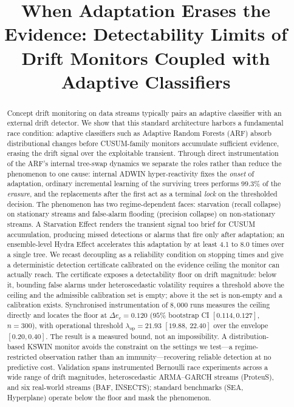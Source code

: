 \documentclass[10pt,conference]{IEEEtran}
\title{When Adaptation Erases the Evidence: Detectability Limits of Drift Monitors Coupled with Adaptive Classifiers}
\author{\IEEEauthorblockN{Anonymous Author(s)}
\IEEEauthorblockA{\textit{Anonymous Affiliation(s)}\\
Paper under Triple-Blind Review}}
\theoremstyle{definition}
\newcommand{\LambdaOpNarrow}{21.93}          %
\newcommand{\LambdaOpNarrowCI}{[19.88,\,22.40]}
\newcommand{\EnvLo}{0.20}\newcommand{\EnvHi}{0.40}
\newcommand{\LearnShare}{99.3}               %
\newcommand{\DeCrit}{0.120}                  %
\newcommand{\DeCritCI}{[0.114, 0.127]}       %
\begin{document}
\maketitle

\begin{abstract}
  Concept drift monitoring on data streams typically pairs an adaptive classifier with an external drift detector. We show that this standard architecture harbors a fundamental race condition: adaptive classifiers such as Adaptive Random Forests (ARF) absorb distributional changes before CUSUM-family monitors accumulate sufficient evidence, erasing the drift signal over the exploitable transient. Through direct instrumentation of the ARF's internal tree-swap dynamics we separate the roles rather than reduce the phenomenon to one cause: internal ADWIN hyper-reactivity fixes the \emph{onset} of adaptation, ordinary incremental learning of the surviving trees performs $\LearnShare\%$ of the \emph{erasure}, and the replacements after the first act as a terminal \emph{lock} on the thresholded decision. The phenomenon has two regime-dependent faces: starvation (recall collapse) on stationary streams and false-alarm flooding (precision collapse) on non-stationary streams. A Starvation Effect renders the transient signal too brief for CUSUM accumulation, producing missed detections or alarms that fire only after adaptation; an ensemble-level Hydra Effect accelerates this adaptation by at least 4.1 to 8.0 times over a single tree. We recast decoupling as a reliability condition on stopping times and give a deterministic detection certificate calibrated on the evidence ceiling the monitor can actually reach. The certificate exposes a detectability floor on drift magnitude: below it, bounding false alarms under heteroscedastic volatility requires a threshold above the ceiling and the admissible calibration set is empty; above it the set is non-empty and a calibration exists. Synchronised instrumentation of $8{,}000$ runs measures the ceiling directly and locates the floor at $\Delta e_c = \DeCrit$ ($95\%$ bootstrap CI $\DeCritCI$, $n = 300$), with operational threshold $\lambda_{\mathrm{op}} = \LambdaOpNarrow$ $\LambdaOpNarrowCI$ over the envelope $[\EnvLo, \EnvHi]$. The result is a measured bound, not an impossibility. A distribution-based KSWIN monitor avoids the constraint on the settings we test---a regime-restricted observation rather than an immunity---recovering reliable detection at no predictive cost. Validation spans instrumented Bernoulli race experiments across a wide range of drift magnitudes, heteroscedastic ARMA--GARCH streams (ProteuS), and six real-world streams (BAF, INSECTS); standard benchmarks (SEA, Hyperplane) operate below the floor and mask the phenomenon.
\end{abstract}
\end{document}
